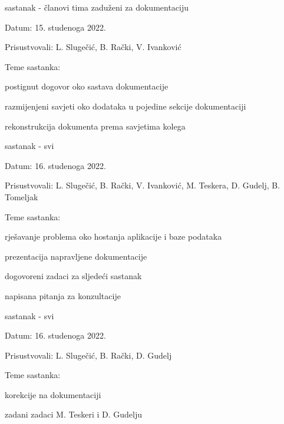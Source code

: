 \begin{packed_enum}
			\eject
			\item  sastanak - 
            članovi tima zaduženi za dokumentaciju
			\item[] \begin{packed_item}
				\item Datum: 15. studenoga 2022.
				\item Prisustvovali: 
                L. Slugečić, B. Rački, V. Ivanković
				\item Teme sastanka:
				\begin{packed_item}
					\item 
                    postignut dogovor oko sastava dokumentacije
					\item 
                    razmijenjeni savjeti oko dodataka u pojedine sekcije dokumentaciji

					\item rekonstrukcija dokumenta prema savjetima kolega
				
				\end{packed_item}
			\end{packed_item}
			
			\item  sastanak - svi
			\item[] \begin{packed_item}
				\item Datum: 16. studenoga 2022.
				\item Prisustvovali: 
                L. Slugečić, B. Rački, V. Ivanković, M. Teskera, D. Gudelj, B. Tomeljak
				\item Teme sastanka:
				\begin{packed_item}
					\item 
                    rješavanje problema oko hostanja aplikacije i baze podataka
					\item 
                    prezentacija napravljene dokumentacije
                    \item
                    dogovoreni zadaci za sljedeći sastanak
                    \item
                    napisana pitanja za konzultacije
				
				\end{packed_item}
			\end{packed_item}
			
			\item  sastanak - svi
			\item[] \begin{packed_item}
				\item Datum: 16. studenoga 2022.
				\item Prisustvovali: 
                L. Slugečić, B. Rački, D. Gudelj
				\item Teme sastanka:
				\begin{packed_item}
					\item 
                    korekcije na dokumentaciji 
                    \item
                    zadani zadaci M. Teskeri i D. Gudelju
				

\end{packed_item}
\end{packed_item}
\end{packed_enum}
